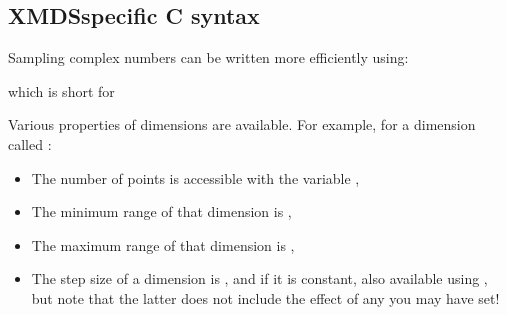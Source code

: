 \documentclass[letterpaper,10pt,english]{sphinxmanual}
\begin{document}
\subsection{XMDS\sphinxhyphen{}specific C syntax}
\label{\detokenize{reference_elements:xmds-specific-c-syntax}}\label{\detokenize{reference_elements:xmdscsyntax}}
\sphinxAtStartPar
Sampling complex numbers can be written more efficiently using:

\begin{sphinxVerbatim}[commandchars=\\\{\}]
\PYG{c+cp}{\PYGZlt{}![CDATA[}
\PYG{c+cp}{]]\PYGZgt{}}
\end{sphinxVerbatim}

\sphinxAtStartPar
which is short for

\begin{sphinxVerbatim}[commandchars=\\\{\}]
\PYG{c+cp}{\PYGZlt{}![CDATA[}
    
    
\PYG{c+cp}{]]\PYGZgt{}}
\end{sphinxVerbatim}

\sphinxAtStartPar
Various properties of dimensions are available.  For example, for a dimension called :

\ignorespaces \begin{itemize}
\item {} 
\sphinxAtStartPar
The number of points is accessible with the variable ,

\item {} 
\sphinxAtStartPar
The minimum range of that dimension is ,

\item {} 
\sphinxAtStartPar
The maximum range of that dimension is ,

\item {} 
\sphinxAtStartPar
The step size of a dimension is , and if it is constant, also available using , but note that the latter does not include the effect of any  you may have set!

\end{itemize}
\end{document}

